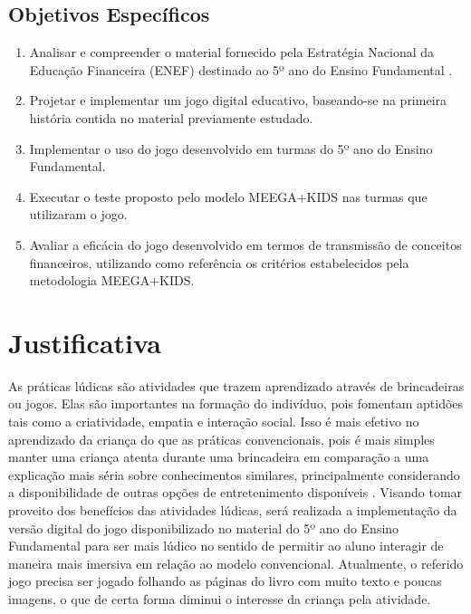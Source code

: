 \subsection{Objetivos Específicos}
\begin{enumerate}[noitemsep,nosep,labelindent=\parindent,leftmargin=*,label={\alph*}) ]
	\item Analisar e compreender o material fornecido pela Estratégia Nacional da Educação Financeira (ENEF) destinado ao 5º ano do Ensino Fundamental \cite{Educacao_financeira_nas_escolas}.
	\item Projetar e implementar um jogo digital educativo, baseando-se na primeira história contida no material previamente estudado.
	\item Implementar o uso do jogo desenvolvido em turmas do 5º ano do Ensino Fundamental.
	\item Executar o teste proposto pelo modelo MEEGA+KIDS \cite{GresseVonWangenheim2020} nas turmas que utilizaram o jogo.
	\item Avaliar a eficácia do jogo desenvolvido em termos de transmissão de conceitos financeiros, utilizando como referência os critérios estabelecidos pela metodologia MEEGA+KIDS\cite{GresseVonWangenheim2020}.
\end{enumerate}
          

\section{Justificativa}
As práticas lúdicas são atividades que trazem aprendizado através de brincadeiras ou jogos. Elas são importantes na formação do indivíduo, pois fomentam aptidões tais como a criatividade, empatia e interação social. Isso é mais efetivo no aprendizado da criança do que as práticas convencionais, pois é mais simples manter uma criança atenta durante uma brincadeira em comparação a uma explicação mais séria sobre conhecimentos similares, principalmente considerando a disponibilidade de outras opções de entretenimento disponíveis \cite{Santos_Thayna_da_silva_2021}.
Visando tomar proveito dos benefícios das atividades lúdicas, será realizada a implementação da versão digital do jogo disponibilizado no material do 5º ano do Ensino Fundamental para ser mais lúdico no sentido de permitir ao aluno interagir de maneira mais imersiva em relação ao modelo convencional. Atualmente, o referido jogo precisa ser jogado folhando as páginas do livro com muito texto e poucas imagens, o que de certa forma diminui o interesse da criança pela atividade.


